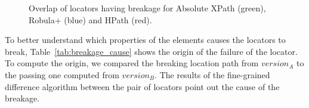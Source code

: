 \begin{figure}
\centering
{}
\caption{Overlap of locators having breakage for Absolute XPath (green), Robula+ (blue) and HPath (red).}  
\label{fig:changes_intersect}
\end{figure}

To better understand which properties of the elements causes the locators to break, Table~\ref{tab:breakage_cause} shows the origin of the failure of the locator. To compute the origin, we compared the breaking location path from  $version_A$ to the passing one computed from $version_B$. The results of the fine-grained difference algorithm between the pair of locators point out the cause of the breakage. 

